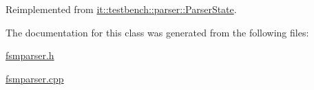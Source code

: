 Reimplemented from \hyperlink{classit_1_1testbench_1_1parser_1_1ParserState_ae7f149551a8a7abce9dc3d6ffcdf684c}{it\-::testbench\-::parser\-::\-Parser\-State}.



The documentation for this class was generated from the following files\-:\begin{DoxyCompactItemize}
\item 
\hyperlink{fsmparser_8h}{fsmparser.\-h}\item 
\hyperlink{fsmparser_8cpp}{fsmparser.\-cpp}\end{DoxyCompactItemize}

